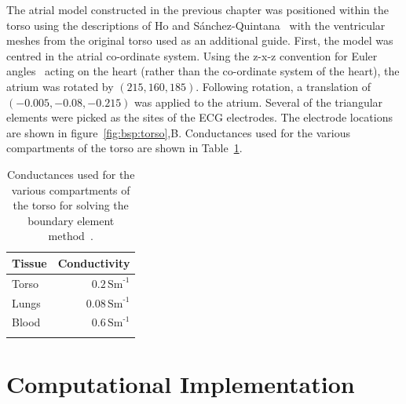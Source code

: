 The atrial model constructed in the previous chapter was positioned within the
torso using the descriptions of Ho and S\'{a}nchez-Quintana~\cite{Ho2009}
with the ventricular meshes from the original torso used as an additional guide.
First, the model was centred in the atrial co-ordinate system.
Using the z-x-z convention for Euler angles~\cite{eulerref} acting on the heart
(rather than the co-ordinate system of the heart), the atrium was rotated by
$\left(215, 160, 185\right)$.
Following rotation, a translation of $\left(-0.005, -0.08, -0.215\right)$ was
applied to the atrium.
Several of the triangular elements were picked as the sites of the ECG
electrodes.
The electrode locations are shown in figure~\ref{fig:bsp:torso},B.
Conductances used for the various compartments of the torso are shown in
Table~\ref{tbl:bsp:conductances}.
\begin{table}[h]
    \caption[Conductances of torso compartments]{
        Conductances used for the various compartments of the torso for solving
        the boundary element method~\cite{Seger2004}.
    }
    \begin{tabular}{l r}
     \toprule
     Tissue & Conductivity \\
     \midrule
     Torso & $0.2\,\text{Sm}^{\text{-1}}$ \\
     Lungs & $0.08\,\text{Sm}^{\text{-1}}$ \\
     Blood & $0.6\,\text{Sm}^{\text{-1}}$ \\
     \bottomrule
     \label{tbl:bsp:conductances}
    \end{tabular}
\end{table}

\section{Computational Implementation}

